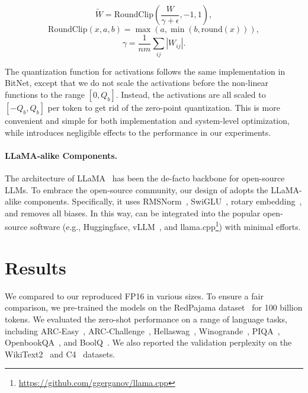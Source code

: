 \begin{equation}
    \widetilde{W} = \mathrm{RoundClip}(\frac{W}{\gamma + \epsilon}, -1, 1),
\end{equation}
\begin{equation}
    \mathrm{RoundClip}(x, a, b) = \max(a, \min(b, \mathrm{round}(x))),
\end{equation}
\begin{equation}
    \gamma = \frac{1}{nm}\sum_{ij} |W_{ij}|.
\end{equation}

The quantization function for activations follows the same implementation in BitNet, except that we do not scale the activations before the non-linear functions to the range $[0, Q_b]$. Instead, the activations are all scaled to $[-Q_b, Q_b]$ per token to get rid of the zero-point quantization. This is more convenient and simple for both implementation and system-level optimization, while introduces negligible effects to the performance in our experiments.

\paragraph{LLaMA-alike Components.}

The architecture of LLaMA~\cite{llama, llama2} has been the de-facto backbone for open-source LLMs. To embrace the open-source community, our design of \our{} adopts the LLaMA-alike components. Specifically, it uses RMSNorm~\cite{rmsnorm}, SwiGLU~\cite{swiglu}, rotary embedding~\cite{rope}, and removes all biases. In this way, \our{} can be integrated into the popular open-source software (e.g., Huggingface, vLLM~\cite{vllm}, and llama.cpp\footnote{\url{https://github.com/ggerganov/llama.cpp}}) with minimal efforts.









\section{Results}

We compared \our{} to our reproduced FP16 \llama{} in various sizes. To ensure a fair comparison, we pre-trained the models on the RedPajama dataset~\cite{redpajama} for 100 billion tokens. We evaluated the zero-shot performance on a range of language tasks, including ARC-Easy~\cite{arc}, ARC-Challenge~\cite{arc}, Hellaswag~\cite{hellaswag}, Winogrande~\cite{winoGrande}, PIQA~\cite{piqa}, OpenbookQA~\cite{openbookqa}, and BoolQ~\cite{boolq}. We also reported the validation perplexity on the WikiText2~\cite{wikitext2} and C4~\cite{c4} datasets.

